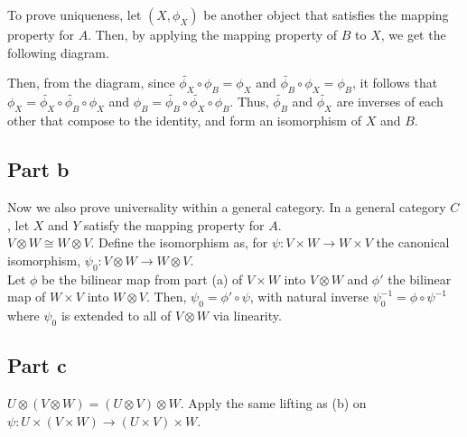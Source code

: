 \documentclass[paper=a4, fontsize=11pt]{scrartcl} %
\numberwithin{equation}{section} %
\numberwithin{figure}{section} %
\numberwithin{table}{section} %
\begin{document}
To prove uniqueness, let $(X, \phi_X)$ be another object that satisfies the mapping property for $A$.
Then, by applying the mapping property of $B$ to $X$, we get the following diagram.
\begin{center}
\end{center}

Then, from the diagram, since $\widetilde{\phi_X} \circ \phi_B =\phi_X$ and $\widetilde{\phi_B} \circ \phi_X = \phi_B$,
it follows that $\phi_X = \widetilde{\phi_X} \circ \widetilde{\phi_B} \circ \phi_X$
and $\phi_B = \widetilde{\phi_B} \circ \widetilde{\phi_X} \circ \phi_B$.
Thus, $\widetilde{\phi_B}$ and $\widetilde{\phi_X}$ are inverses of each other that compose to the identity,
and form an isomorphism of $X$ and $B$.

\subsection*{Part b}
Now we also prove universality within a general category. In a general category $C$, let $X$ and $Y$ satisfy the mapping property for $A$. \\

$V \otimes W \cong W \otimes V$. Define the isomorphism as, for $\psi: V \times W \to W \times V$ the canonical isomorphism, $\psi_0: V \otimes W \to W \otimes V$. \\


Let $\phi$ be the bilinear map from part (a) of $V \times W$ into $V \otimes W$ and $\phi'$ the bilinear map of $W \times V$ into $W \otimes V$. 
Then, $ \psi_0 = \phi' \circ \psi$, with natural inverse $\psi_0 ^{-1} = \phi \circ \psi^{-1}$ 
where $\psi_0$ is extended to all of $V \otimes W$ via linearity. \\

\subsection*{Part c}

$U \otimes (V \otimes W) = (U \otimes V) \otimes W$. Apply the same lifting as (b) on $\psi: U \times (V \times W) \to (U \times V) \times W$.\\
\end{document}
